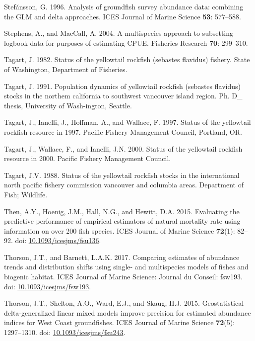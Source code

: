\documentclass[12pt,]{article}
\begin{document}
\hypertarget{ref-Stefansson1996}{}
Stefánsson, G. 1996. Analysis of groundfish survey abundance data:
combining the GLM and delta approaches. ICES Journal of Marine Science
\textbf{53}: 577--588.

\hypertarget{ref-Stephens2004}{}
Stephens, A., and MacCall, A. 2004. A multispecies approach to
subsetting logbook data for purposes of estimating CPUE. Fisheries
Research \textbf{70}: 299--310.

\hypertarget{ref-Tagart1982}{}
Tagart, J. 1982. Status of the yellowtail rockfish (sebastes flavidus)
fishery. State of Washington, Department of Fisheries.

\hypertarget{ref-Tagart1991}{}
Tagart, J. 1991. Population dynamics of yellowtail rockfish (sebastes
flavidus) stocks in the northem california to southwest vancouver island
region. Ph. D\_ thesis, University of Wash-ington, Seattle.

\hypertarget{ref-Tagart1997}{}
Tagart, J., Ianelli, J., Hoffman, A., and Wallace, F. 1997. Status of
the yellowtail rockfish resource in 1997. Pacific Fishery Management
Council, Portland, OR.

\hypertarget{ref-Tagart2000}{}
Tagart, J., Wallace, F., and Ianelli, J.N. 2000. Status of the
yellowtail rockfish resource in 2000. Pacific Fishery Management
Council.

\hypertarget{ref-Tagart1988}{}
Tagart, J.V. 1988. Status of the yellowtail rockfish stocks in the
international north pacific fishery commission vancouver and columbia
areas. Department of Fish; Wildlife.

\hypertarget{ref-Then2015}{}
Then, A.Y., Hoenig, J.M., Hall, N.G., and Hewitt, D.A. 2015. Evaluating
the predictive performance of empirical estimators of natural mortality
rate using information on over 200 fish species. ICES Journal of Marine
Science \textbf{72}(1): 82--92. doi:
\href{https://doi.org/10.1093/icesjms/fsu136}{10.1093/icesjms/fsu136}.

\hypertarget{ref-Thorson2017}{}
Thorson, J.T., and Barnett, L.A.K. 2017. Comparing estimates of
abundance trends and distribution shifts using single- and multispecies
models of fishes and biogenic habitat. ICES Journal of Marine Science:
Journal du Conseil: fsw193. doi:
\href{https://doi.org/10.1093/icesjms/fsw193}{10.1093/icesjms/fsw193}.

\hypertarget{ref-Thorson2015}{}
Thorson, J.T., Shelton, A.O., Ward, E.J., and Skaug, H.J. 2015.
Geostatistical delta-generalized linear mixed models improve precision
for estimated abundance indices for West Coast groundfishes. ICES
Journal of Marine Science \textbf{72}(5): 1297--1310. doi:
\href{https://doi.org/10.1093/icesjms/fsu243}{10.1093/icesjms/fsu243}.
\end{document}
